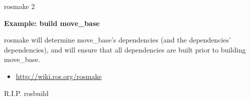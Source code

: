 \documentclass{beamer}
\begin{document}
\begin{frame}{rosmake 2}
\begin{large}\textbf{Example: build move\_base}\end{large}


rosmake will determine move\_base's dependencies (and the dependencies' dependencies), and will ensure that all dependencies are built prior to building move\_base.\\	
\begin{itemize}
	\item \url{http://wiki.ros.org/rosmake}
\end{itemize}
\end{frame}
\begin{frame}
	\Huge{\centerline{R.I.P. rosbuild}}
\end{frame}	
\end{document}
